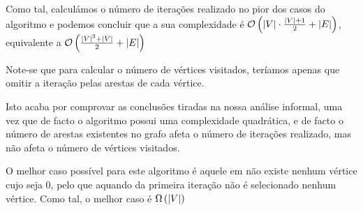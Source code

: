 Como tal, calculámos o número de iterações realizado no pior dos
casos do algoritmo e podemos concluir que a sua complexidade é
$\mathcal{O}\left(\left\lvert V \right\rvert \cdot \frac{\left\lvert V \right\rvert+1}{2} + \left\lvert E \right\rvert \right)$,
equivalente a
$\mathcal{O}\left(\frac{\left\lvert V \right\rvert^2 + \left\lvert V \right\rvert}{2} + \left\lvert E \right\rvert \right)$

Note-se que para calcular o número de vértices visitados, teríamos apenas que
omitir a iteração pelas arestas de cada vértice.

Isto acaba por comprovar as conclusões tiradas na nossa análise informal, uma
vez que de facto o algoritmo possui uma complexidade quadrática, e de facto o
número de arestas existentes no grafo afeta o número de iterações realizado, mas
não afeta o número de vértices visitados.

O melhor caso possível para este algoritmo é aquele em não existe
nenhum vértice cujo  seja 0, pelo que aquando da
primeira iteração não é selecionado nenhum vértice. Como tal, o
melhor caso é $\Omega\left(\left\lvert V \right\rvert\right)$
